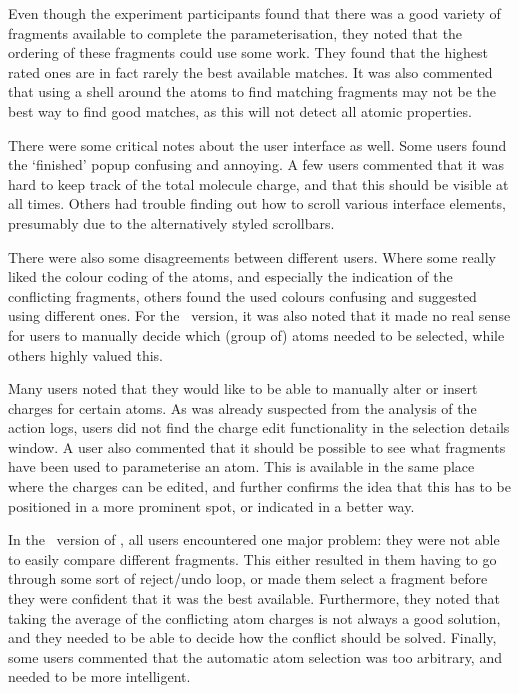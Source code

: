 Even though the experiment participants found that there was a good variety of fragments available to complete the parameterisation, they noted that the ordering of these fragments could use some work. They found that the highest rated ones are in fact rarely the best available matches. It was also commented that using a shell around the atoms to find matching fragments may not be the best way to find good matches, as this will not detect all atomic properties.

There were some critical notes about the user interface as well. Some users found the `finished' popup confusing and annoying. A few users commented that it was hard to keep track of the total molecule charge, and that this should be visible at all times. Others had trouble finding out how to scroll various interface elements, presumably due to the alternatively styled scrollbars.

There were also some disagreements between different users. Where some really liked the colour coding of the atoms, and especially the indication of the conflicting fragments, others found the used colours confusing and suggested using different ones. For the \IDa\ version, it was also noted that it made no real sense for users to manually decide which (group of) atoms needed to be selected, while others highly valued this.

Many users noted that they would like to be able to manually alter or insert charges for certain atoms. As was already suspected from the analysis of the action logs, users did not find the charge edit functionality in the selection details window. A user also commented that it should be possible to see what fragments have been used to parameterise an atom. This is available in the same place where the charges can be edited, and further confirms the idea that this has to be positioned in a more prominent spot, or indicated in a better way.

In the \IDb\ version of \oframp, all users encountered one major problem: they were not able to easily compare different fragments. This either resulted in them having to go through some sort of reject/undo loop, or made them select a fragment before they were confident that it was the best available. Furthermore, they noted that taking the average of the conflicting atom charges is not always a good solution, and they needed to be able to decide how the conflict should be solved. Finally, some users commented that the automatic atom selection was too arbitrary, and needed to be more intelligent.


